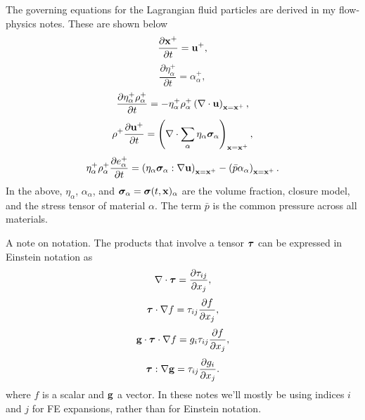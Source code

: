 \documentclass[11pt]{report}
\begin{document}
The governing equations for the Lagrangian fluid particles are derived in my flow-physics notes. These are shown below
\begin{equation}
    \label{eq:lag_gov_evol_x}
    \frac{\partial \mathbf{x}^+}{\partial t} = \mathbf{u}^+,
\end{equation}
\begin{equation}
    \label{eq:lag_gov_evol_eta}
    \frac{\partial \eta^+_\alpha}{\partial t} = \alpha^+_\alpha,
\end{equation}
\begin{equation}
    \label{eq:lag_gov_evol_rho}
    \frac{\partial \eta^+_\alpha \rho^+_\alpha}{\partial t} = -\eta^+_\alpha \rho^+_\alpha \left( \nabla \cdot \mathbf{u} \right)_{\mathbf{x} = \mathbf{x}^+},
\end{equation}
\begin{equation}
    \label{eq:lag_gov_evol_u}
    \rho^+ \frac{\partial \mathbf{u}^+}{\partial t} = \left ( \nabla \cdot \sum_\alpha \eta_\alpha \bm \sigma_\alpha \right )_{\mathbf{x} = \mathbf{x}^+},
\end{equation}
\begin{equation}
    \label{eq:lag_gov_evol_e}
    \eta^+_\alpha \rho^+_\alpha \frac{\partial e^+_\alpha}{\partial t} = \left ( \eta_\alpha \bm \sigma_\alpha : \nabla \mathbf{u} \right )_{\mathbf{x} = \mathbf{x}^+} - \left( \bar{p} \alpha_\alpha \right)_{\mathbf{x} = \mathbf{x}^+}. 
\end{equation}
In the above, $\eta_\alpha$, $\alpha_\alpha$, and $\bm \sigma_\alpha = \bm \sigma(t,\mathbf{x})_\alpha$ are the volume fraction, closure model, and the stress tensor of material $\alpha$. The term $\bar{p}$ is the common pressure across all materials.

A note on notation. The products that involve a tensor $\bm \tau$ can be expressed in Einstein notation as
\begin{equation*}
    \nabla \cdot \bm \tau = \frac{\partial \tau_{ij}}{\partial x_j},
\end{equation*}
\begin{equation*}
    \bm \tau \cdot \nabla f = \tau_{ij} \frac{\partial f}{\partial x_j},
\end{equation*}
\begin{equation*}
    \mathbf{g} \cdot \bm \tau \cdot \nabla f = g_i \tau_{ij} \frac{\partial f}{\partial x_j},
\end{equation*}
\begin{equation*}
    \bm \tau : \nabla \mathbf{g} = \tau_{ij} \frac{\partial g_i}{\partial x_j}.
\end{equation*}
where $f$ is a scalar and $\mathbf{g}$ a vector. In these notes we'll mostly be using indices $i$ and $j$ for FE expansions, rather than for Einstein notation.
\end{document}

